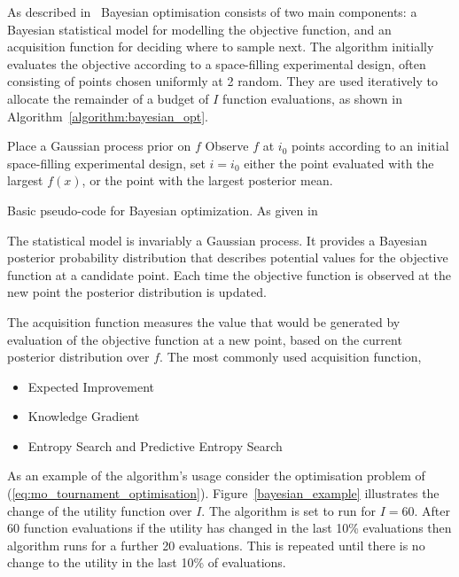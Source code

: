 As described in~\cite{Frazier2018} Bayesian optimisation consists of two main
components: a Bayesian statistical model for modelling the objective function,
and an acquisition function for deciding where to sample next. The algorithm
initially evaluates the objective according to a space-filling experimental
design, often consisting of points chosen uniformly at 2 random. They are used
iteratively to allocate the remainder of a budget of \(I\) function evaluations, as
shown in Algorithm~\ref{algorithm:bayesian_opt}.

\begin{algorithm}[H]
Place a Gaussian process prior on \(f\)\;
Observe \(f\) at \(i_0\) points according to an initial space-filling experimental design, set \(i = i_0\) \;
\Return either the point evaluated with the largest \(f(x)\), or the point with the largest posterior mean.
\caption{Basic pseudo-code for Bayesian optimization. As given in~\cite{Frazier2018}}\label{algorithm:bayesian_opt}
\end{algorithm}

The statistical model is invariably a Gaussian process. It provides a Bayesian
posterior probability distribution that describes potential values for the
objective function at a candidate point. Each time the objective function is
observed at the new point the posterior distribution is updated.

The acquisition function measures the value that would be generated by
evaluation of the objective function at a new point, based on the current
posterior distribution over \(f\). The most commonly used acquisition function,

\begin{itemize}
    \item Expected Improvement~\cite{Jones1998}
    \item Knowledge Gradient~\cite{Frazier2009}
    \item Entropy Search and Predictive Entropy Search~\cite{Hennig2012}
\end{itemize}

As an example of the algorithm's usage consider the optimisation problem
of (\ref{eq:mo_tournament_optimisation}). Figure~\ref{bayesian_example}
illustrates the change of the utility function over \(I\).
The algorithm is set to run for \(I=60\). After 60 function evaluations if the
utility has changed in the last 10\% evaluations then algorithm runs for a
further 20 evaluations. This is repeated until there is no change to the utility
in the last 10\% of evaluations.



